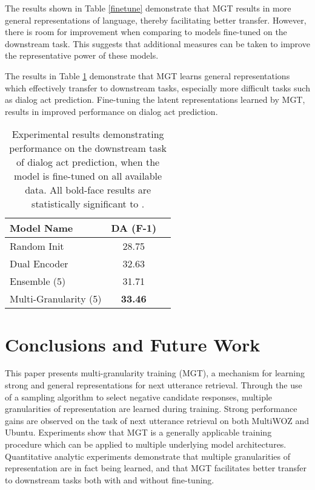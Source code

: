 \documentclass[11pt,a4paper]{article}
\begin{document}
The results shown in Table \ref{finetune} demonstrate that MGT results in more general representations of language, thereby facilitating better transfer. However, there is room for improvement when comparing to models fine-tuned on the downstream task. This suggests that additional measures can be taken to improve the representative power of these models. 



The results in Table \ref{finetune2} demonstrate that MGT learns general representations which effectively transfer to downstream tasks, especially more difficult tasks such as dialog act prediction. Fine-tuning the latent representations learned by MGT, results in improved performance on dialog act prediction.



\begin{table}[]
\centering
\begin{tabular}{|l|c|c|}
\hline
\textbf{Model Name}              & \textbf{DA (F-1)} \\ \hline
Random Init                     & 28.75        \\ 
Dual Encoder                     & 32.63       \\ 
Ensemble (5)                 & 31.71     \\ 
Multi-Granularity (5)                                  & \textbf{33.46}         \\ \hline

\end{tabular}
\caption{Experimental results demonstrating performance on the downstream task of dialog act prediction, when the model is fine-tuned on all available data. All bold-face results are statistically significant to .}
\label{finetune2}
\end{table}












\section{Conclusions and Future Work}

This paper presents multi-granularity training (MGT), a mechanism for learning strong and general representations for next utterance retrieval. Through the use of a sampling algorithm to select negative candidate responses, multiple granularities of representation are learned during training. Strong performance gains are observed on the task of next utterance retrieval on both MultiWOZ and Ubuntu. Experiments show that MGT is a generally applicable training procedure which can be applied to multiple underlying model architectures. Quantitative analytic experiments demonstrate that multiple granularities of representation are in fact being learned, and that MGT facilitates better transfer to downstream tasks both with and without fine-tuning.
\end{document}
